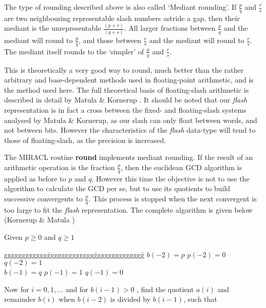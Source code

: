       The  type  of  rounding  described  above  is  also  called  `Mediant 
      rounding'.  If $\frac{p}{q}$ and $\frac{r}{s}$  are  two  neighbouring  
      representable 
      slash   numbers   astride   a   gap,   then   their  mediant  is  the 
      unrepresentable $\frac{(p+r)}{(q+s)}$.  All larger  fractions  between 
      $\frac{p}{q}$ 
      and the mediant will round to $\frac{p}{q}$,  and those between 
      $\frac{r}{s}$ and the 
      mediant will round  to  $\frac{r}{s}$. The mediant itself rounds to the 
      `simpler' of $\frac{p}{q}$ and $\frac{r}{s}$.  

      This is theoretically a very good way to round,  much better than the 
      rather arbitrary and base-dependent methods  used  in  floating-point 
      arithmetic,  and is the method used here.  The full theoretical basis 
      of floating-slash arithmetic is  described  in  detail  by  Matula  \& 
      Kornerup  \cite{Matula85}.  It should be noted that our {\em flash} 
      representation 
      is in fact a cross between  the  fixed-  and  floating-slash  systems 
      analysed  by  Matula \& Kornerup,  as our slash can only float between 
      words,  and not between bits.  However  the  characteristics  of  the 
      {\em flash}  data-type  will  tend  to  those  of floating-slash,  as the 
      precision is increased.  

      The MIRACL routine {\bf round} implements mediant rounding. If the result 
      of an arithmetic operation is the fraction $\frac{p}{q}$,  then the euclidean 
      GCD algorithm is applied as before to $p$ and $q$.  However this time the 
      objective  is  not  to use the algorithm to calculate the GCD per se, 
      but to use its quotients to build successive  convergents  to  
      $\frac{p}{q}$.  
      This  process is stopped when the next convergent is too large to fit 
      the {\em flash} representation.  The complete algorithm  is  given  below 
      (Kornerup \& Matula \cite{Korn83}) 


      Given $p\geq0$ and $q\geq1$

      \begin{tabbing}
        gggggggggggg\=ggggggggggggg\=gggggggggggggg\= \kill           
                  \>$b(-2)=p$ \>  $p(-2)=0$ \> $q(-2)=1$  \\
                  \>$b(-1)=q$ \>  $p(-1)=1$ \> $q(-1)=0$
      \end{tabbing}

      Now  for  $i=0,1,\ldots$  and  for  $b(i-1)>0$ ,  find the quotient 
      $a(i)$ and remainder $b(i)$ when $b(i-2)$ is divided by $b(i-1)$, 
      such that 

